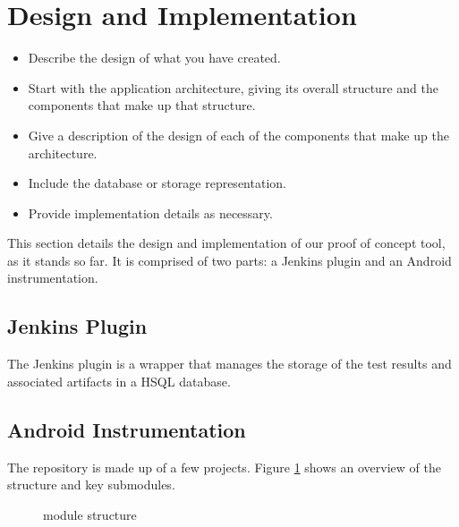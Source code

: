 \section{Design and Implementation}
\label{sec:imp}

\begin{mdframed}
	\begin{itemize}
		\item Describe the design of what you have created.
		\item Start with the application architecture, giving its overall structure and the components that make up that structure.
		\item Give a description of the design of each of the components that make up the architecture.
		\item Include the database or storage representation.
		\item Provide implementation details as necessary.
	\end{itemize}
\end{mdframed}


This section details the design and implementation of our proof of concept tool, as it stands so far. It is comprised of two parts: a Jenkins plugin and an Android instrumentation.


\subsection{Jenkins Plugin}

The Jenkins plugin is a wrapper that manages the storage of the test results and associated artifacts in a HSQL database.


\subsection{Android Instrumentation}

The repository is made up of a few projects. Figure \ref{fig:repo_structure} shows an overview of the structure and key submodules.

\begin{figure}[h]
\caption{\heisentest{} module structure}
\label{fig:repo_structure}
\end{figure}

